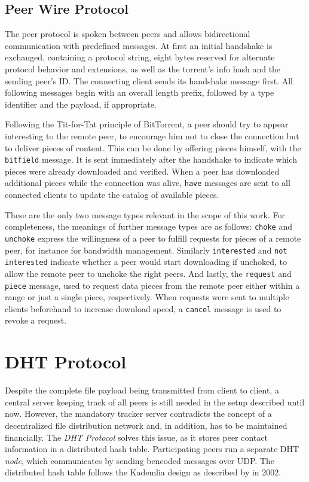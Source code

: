 \documentclass[10pt, a4paper, twoside, headsepline]{scrbook}
\renewcommand{\_}{\origunderscore\allowbreak}
\begin{document}
\subsection{Peer Wire Protocol}
The peer protocol is spoken between peers and allows bidirectional communication with predefined messages. At first an initial handshake is exchanged, containing a protocol string, eight bytes reserved for alternate protocol behavior and extensions, as well as the torrent's info hash and the sending peer's ID. The connecting client sends its handshake message first. All following messages begin with an overall length prefix, followed by a type identifier and the payload, if appropriate.

Following the Tit-for-Tat principle of BitTorrent, a peer should try to appear interesting to the remote peer, to encourage him not to close the connection but to deliver pieces of content. This can be done by offering pieces himself, with the \texttt{bitfield} message. It is sent immediately after the handshake to indicate which pieces were already downloaded and verified. When a peer has downloaded additional pieces while the connection was alive, \texttt{have} messages are sent to all connected clients to update the catalog of available pieces.

These are the only two message types relevant in the scope of this work. For completeness, the meanings of further message types are as follows: \texttt{choke} and \texttt{unchoke} express the willingness of a peer to fulfill requests for pieces of a remote peer, for instance for bandwidth management. Similarly \texttt{interested} and \texttt{not interested} indicate whether a peer would start downloading if unchoked, to allow the remote peer to unchoke the right peers. And lastly, the \texttt{request} and \texttt{piece} message, used to request data pieces from the remote peer either within a range or just a single piece, respectively. When requests were sent to multiple clients beforehand to increase download speed, a \texttt{cancel} message is used to revoke a request.

\section{DHT Protocol}
\label{dht}
Despite the complete file payload being transmitted from client to client, a central server keeping track of all peers is still needed in the setup described until now. However, the mandatory tracker server contradicts the concept of a decentralized file distribution network and, in addition, has to be maintained financially. The \emph{DHT Protocol} \cite{bep5} solves this issue, as it stores peer contact information in a distributed hash table. Participating peers run a separate DHT \emph{node}, which communicates by sending bencoded messages over UDP. The distributed hash table follows the Kademlia design as described by \textcite{kademlia} in 2002.
\end{document}
